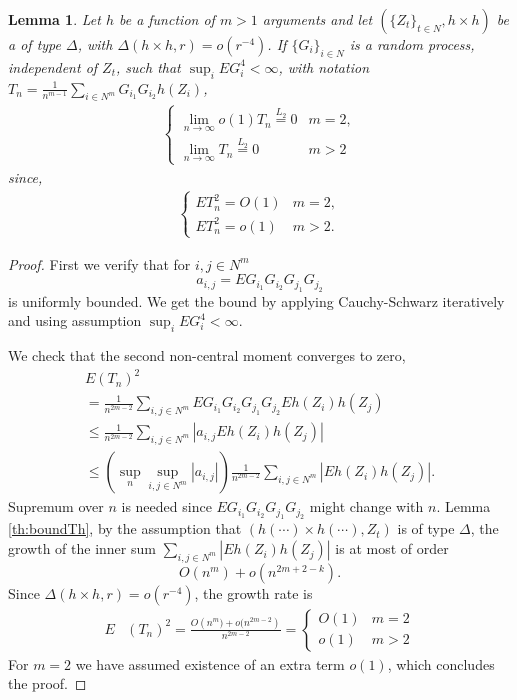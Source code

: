 \documentclass{article} %
\newtheorem{lemma}{Lemma}
\newcommand{\ev}{E}
\begin{document}
\begin{lemma}
 \label{lem:higherVstats}
 Let $h$ be a function of  $m>1$ arguments and let $(\{ Z_{t}\}_{t \in N},h \times h)$ be a of type $\varDelta$, with $\varDelta(h \times h,r) = o( r^{-4})$. If  $\{ G_i \}_{i \in N}$  is a random process,  independent of $ Z_{t}$, such that $\sup_{i} \ev G_i^4 < \infty$, with notation $T_n =\frac {1} {n^{m-1}} \sum_{i \in N^m}   G_{i_1}G_{i_2}   h(Z_i)  $,
\begin{align*}
 \begin{cases}
 \lim_{n \to \infty}  o(1) T_n \overset{L_2}{=} 0 & m=2,  \\
\lim_{n \to \infty} T_n \overset{L_2}{=} 0  & m>2
\end{cases}
\end{align*}
since, 
\begin{align*}
 \begin{cases}
 \ev T_n^2 = O(1) & m=2,  \\
\ev T_n^2  = o(1)  & m>2. 
\end{cases}
\end{align*}
\end{lemma}
\begin{proof}
First we verify that for $i,j \in N^m$
\[
 a_{i,j} =  \ev G_{i_1} G_{i_2}  G_{j_1} G_{j_2}
\]
is uniformly bounded. We get the bound by applying Cauchy-Schwarz iteratively and using assumption   $\sup_{i} \ev G_i^4 < \infty$. 

We check that the second non-central moment converges to zero,
\begin{align*}
&\ev  \left( T_n \right)^2 \\
&= \frac {1} {n^{2m-2}}   \sum_{i,j \in N^{m}}    \ev G_{i_1} G_{i_2} G_{j_1} G_{j_2} \ev h(Z_i)h(Z_j)   \\
&\leq    \frac {1} {n^{2m-2}} \sum_{i,j \in N^{m}}  |a_{i,j} \ev h(Z_i)h(Z_j) |  &\\
&\leq \left( \sup_{n} \sup_{i,j \in N^m} |a_{i,j}| \right) \frac {1} {n^{2m-2}} \sum_{i,j \in N^{m}} |\ev h(Z_i)h(Z_j) |.
\end{align*}
Supremum over $n$ is needed since $\ev G_{i_1} G_{i_2}  G_{j_1} G_{j_2}$ might change with $n$. Lemma \ref{th:boundTh}, by the assumption that  $(h(\cdots ) \times h(\cdots ),Z_t )$ is of type $\varDelta$, the growth of the inner sum 
$
 \sum_{i,j \in N^{m}} |\ev h(Z_i)h(Z_j) |
$
is at most of order 
\[
O(n^m) +o(n^{2 m +2-k}). 
\]
Since $\varDelta(h \times h,r) =o( r^{-4})$, the growth rate is 
\begin{align*}
 \ev &\left( T_n \right)^2= \frac{O\left(n^m) +o(n^{2m-2}\right) }{ n^{2m-2}} =\begin{cases}
O(1)   & m=2\\
o(1) & m >2
\end{cases}
\end{align*}
For $m=2$ we have assumed existence of an  extra term $o(1)$,  which concludes the proof.
\end{proof}
\end{document}
